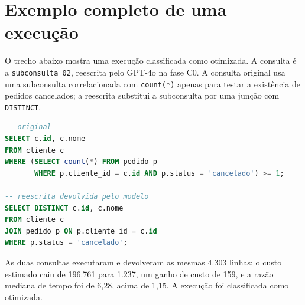 \documentclass[12pt]{article}
\begin{document}
\newpage
\section{Exemplo completo de uma execução}
\label{ap:exemplo}

O trecho abaixo mostra uma execução classificada como otimizada. A consulta é a \texttt{subconsulta\_02}, reescrita pelo GPT-4o na fase C0. A consulta original usa uma subconsulta correlacionada com \texttt{count(*)} apenas para testar a existência de pedidos cancelados; a reescrita substitui a subconsulta por uma junção com \texttt{DISTINCT}.

\begin{lstlisting}[language=SQL]
-- original
SELECT c.id, c.nome
FROM cliente c
WHERE (SELECT count(*) FROM pedido p
       WHERE p.cliente_id = c.id AND p.status = 'cancelado') >= 1;

-- reescrita devolvida pelo modelo
SELECT DISTINCT c.id, c.nome
FROM cliente c
JOIN pedido p ON p.cliente_id = c.id
WHERE p.status = 'cancelado';
\end{lstlisting}

As duas consultas executaram e devolveram as mesmas 4.303 linhas; o custo estimado caiu de 196.761 para 1.237, um ganho de custo de 159, e a razão mediana de tempo foi de 6,28, acima de 1,15. A execução foi classificada como otimizada.
\end{document}
